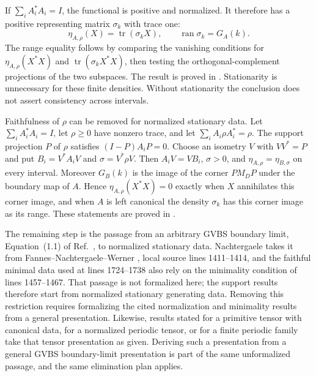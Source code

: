 \documentclass{article}
\begin{document}
If $\sum_iA_i^*A_i=I$, the functional is positive and normalized.
It therefore has a positive representing matrix $\sigma_k$ with trace one:
\[
 \eta_{A,\rho}(X)=\operatorname{tr}(\sigma_kX),
 \qquad \operatorname{ran}\sigma_k=G_A(k).
\]
The range equality follows by comparing the vanishing conditions for
$\eta_{A,\rho}(X^*X)$ and
$\operatorname{tr}(\sigma_kX^*X)$, then testing the orthogonal-complement
projections of the two subspaces. The result is proved in
.
Stationarity is unnecessary for these finite densities. Without stationarity
the conclusion does not assert consistency across intervals.

Faithfulness of $\rho$ can be removed for normalized stationary data.
Let $\sum_iA_i^*A_i=I$, let $\rho\geq0$ have nonzero trace, and let
$\sum_iA_i\rho A_i^*=\rho$. The support projection $P$ of $\rho$ satisfies
$(I-P)A_iP=0$. Choose an isometry $V$ with $VV^*=P$ and put
$B_i=V^*A_iV$ and $\sigma=V^*\rho V$. Then $A_iV=VB_i$, $\sigma>0$, and
$\eta_{A,\rho}=\eta_{B,\sigma}$ on every interval. Moreover
$G_B(k)$ is the image of the corner $PM_DP$ under the boundary map of $A$.
Hence $\eta_{A,\rho}(X^*X)=0$ exactly when $X$ annihilates this corner
image, and when $A$ is left canonical the density $\sigma_k$ has this
corner image as its range. These statements are proved in
.

The remaining step is the passage from an arbitrary GVBS boundary limit,
Equation~(1.1) of Ref.~\cite{Nachtergaele1996Spectral}, to normalized
stationary data. Nachtergaele takes it from
Fannes--Nachtergaele--Werner \cite{Nachtergaele1996Spectral}, local source
lines 1411--1414, and the faithful minimal data used at lines 1724--1738
also rely on the minimality condition of lines 1457--1467. That passage is
not formalized here; the support results therefore start from normalized
stationary generating data. Removing this restriction requires formalizing
the cited normalization and minimality results from a general presentation.
Likewise, results stated for a primitive tensor with canonical data, for a
normalized periodic tensor, or for a finite periodic family take that tensor
presentation as given. Deriving such a presentation from a general GVBS
boundary-limit presentation is part of the same unformalized passage, and the
same elimination plan applies.
\end{document}
